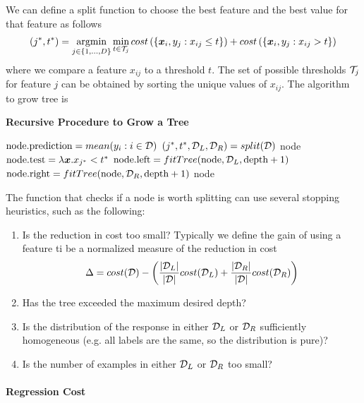 We can define a split function to choose the best feature and the best value for that feature as follows
\begin{align*}
(j^*,t^*)=\argmin_{j\in\{1,\dotsc,D\}}\min_{t\in\cT_j}cost\left(\{\vec{x}_i,y_j:x_{ij}\leq t\}\right)+cost\left(\{\vec{x}_i,y_j:x_{ij}>t\}\right)
\end{align*}
where we compare a feature $x_{ij}$ to a threshold $t$. The set of possible thresholds $\mathcal{T}_j$ for feature $j$ can be obtained by sorting the unique values of $x_{ij}$. The algorithm to grow tree is
\begin{algorithm}[H]
	\caption*{\bf Recursive Procedure to Grow a Tree}
	\begin{algorithmic}
		\State $\text{node.prediction}=mean(y_i:i\in\mathcal{D})$
		\State $(j^*,t^*,\mathcal{D}_L,\mathcal{D}_R)=split(\mathcal{D})$
		\State \Return node
		\Else
		\State $\text{node.test}=\lambda\boldsymbol{x}.x_{j^*}<t^*$
		\State $\text{node.left}=fitTree(\text{node},\mathcal{D}_L,\text{depth}+1)$
		\State $\text{node.right}=fitTree(\text{node},\mathcal{D}_R,\text{depth}+1)$
		\State \Return node
		\EndIf
		\EndFunction
	\end{algorithmic}
\end{algorithm}
The function that checks if a node is worth splitting can use several stopping heuristics, such as the following:
\begin{enumerate}
	\item Is the reduction in cost too small? Typically we define the gain of using a feature ti be a normalized measure of the reduction in cost
	\begin{align*}
	\Delta=cost(\mathcal{D})-\left(\frac{\left\vert\mathcal{D}_L\right\vert}{\left\vert\mathcal{D}\right\vert}cost(\mathcal{D}_L)+\frac{\left\vert\mathcal{D}_R\right\vert}{\left\vert\mathcal{D}\right\vert}cost(\mathcal{D}_R)\right)
	\end{align*}
	\item Has the tree exceeded the maximum desired depth?
	\item Is the distribution of the response in either $\mathcal{D}_L$ or $\mathcal{D}_R$ sufficiently homogeneous (e.g. all labels are the same, so the distribution is pure)?
	\item Is the number of examples in either $\mathcal{D}_L$ or $\mathcal{D}_R$ too small?
\end{enumerate}

\paragraph{Regression Cost}

